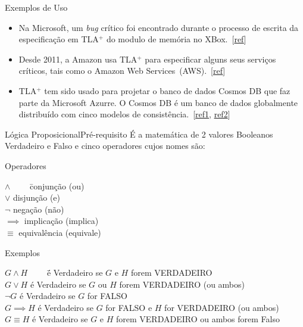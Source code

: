 \begin{frame}{Exemplos de Uso}\small
  \begin{itemize}[<+-| alert@+>]
  \item Na Microsoft, um \textit{bug} crítico foi encontrado durante o
    processo de escrita da especificação em TLA$^+$ do modulo de
    memória no
    XBox.~[\href{http://channel9.msdn.com/Events/Build/2014/3-642\#time=21m46s}{ref}]
  \item Desde 2011, a Amazon usa TLA$^+$ para especificar alguns seus
    serviços críticos, tais como o Amazon Web
    Services~(AWS).~[\href{http://lamport.azurewebsites.net/tla/amazon.html}{ref}]
  \item TLA$^+$ tem sido usado para projetar o banco de dados Cosmos
    DB que faz parte da Microsoft Azurre. O Cosmos DB é um banco de
    dados globalmente distribuído com cinco modelos de
    consistência.~[\href{https://techcrunch.com/2017/05/10/with-cosmos-db-microsoft-wants-to-build-one-database-to-rule-them-all/}{ref1},
    \href{https://techcrunch.com/2017/05/10/with-cosmos-db-microsoft-wants-to-build-one-database-to-rule-them-all/}{ref2}]
  \end{itemize}
  
\end{frame}

\begin{frame}{Lógica Proposicional}{Pré-requisito}
  É a matemática de 2 valores Booleanos {\sc Verdadeiro} e {\sc Falso} 
  e cinco operadores cujos nomes são:

  \begin{block}{Operadores}
    \begin{tabbing}
        $\land\qquad$ \= conjunção (ou) \\
        $\lor$  \> disjunção (e) \\
        $\lnot$ \> negação (não) \\
        $\implies$ \> implicação (implica) \\
        $\equiv$ \> equivalência (equivale) \\
      \end{tabbing}
  \end{block}

    \pause
    \begin{block}{Exemplos}\tiny
      \begin{tabbing}
        $G\land H\qquad$ \= é {\sc Verdadeiro} se $G$ e $H$ forem {\sc VERDADEIRO} \\
        $G\lor H$  \> é {\sc Verdadeiro} se $G$ ou $H$ forem {\sc VERDADEIRO} (ou ambos) \\
        $\lnot G$ \> é {\sc Verdadeiro} se $G$ for {\sc FALSO} \\
        $G\implies H$ \> é {\sc Verdadeiro} se $G$ for {\sc FALSO} e $H$ for {\sc VERDADEIRO} (ou ambos) \\
        $G\equiv H$ \> é {\sc Verdadeiro} se $G$ e $H$ forem {\sc VERDADEIRO} ou ambos forem {\sc Falso}\\
      \end{tabbing}
    \end{block}
  
\end{frame}


